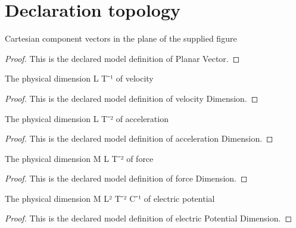 \section{Declaration topology}
\begin{definition}
  \label{def:physics:phyx-mini-0993:phyxminiproblems-problemphyxmini0993-planarvector}
  Cartesian component vectors in the plane of the supplied figure
\end{definition}
\begin{proof}
  This is the declared model definition of Planar Vector.
\end{proof}
\begin{definition}
  \label{def:physics:phyx-mini-0993:phyxminiproblems-problemphyxmini0993-velocitydimension}
  The physical dimension L T⁻¹ of velocity
\end{definition}
\begin{proof}
  This is the declared model definition of velocity Dimension.
\end{proof}
\begin{definition}
  \label{def:physics:phyx-mini-0993:phyxminiproblems-problemphyxmini0993-accelerationdimension}
  The physical dimension L T⁻² of acceleration
\end{definition}
\begin{proof}
  This is the declared model definition of acceleration Dimension.
\end{proof}
\begin{definition}
  \label{def:physics:phyx-mini-0993:phyxminiproblems-problemphyxmini0993-forcedimension}
  The physical dimension M L T⁻² of force
\end{definition}
\begin{proof}
  This is the declared model definition of force Dimension.
\end{proof}
\begin{definition}
  \label{def:physics:phyx-mini-0993:phyxminiproblems-problemphyxmini0993-electricpotentialdimension}
  The physical dimension M L² T⁻² C⁻¹ of electric potential
\end{definition}
\begin{proof}
  This is the declared model definition of electric Potential Dimension.
\end{proof}
